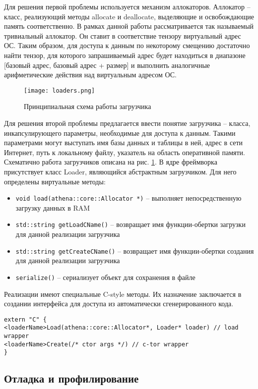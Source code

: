 Для решения первой проблемы используется механизм аллокаторов. Аллокатор --
класс, реализующий методы allocate и deallocate, выделяющие и освобождающие
память соответственно. В рамках данной работы рассматривается так называемый
тривиальный аллокатор. Он ставит в соответствие тензору виртуальный адрес ОС.
Таким образом, для доступа к данным по некоторому смещению достаточно найти
тензор, для которого запрашиваемый адрес будет находиться в диапазоне [базовый адрес, базовый адрес + размер]
и выполнить аналогичные арифметические действия над виртуальным адресом ОС.

\begin{figure}[h]
    \centering
    \texttt{[image: loaders.png]}
    \caption{Принципиальная схема работы загрузчика}
    \label{fig:loaders}
\end{figure}

Для решения второй проблемы предлагается ввести понятие загрузчика -- класса,
инкапсулирующего параметры, необходимые для доступа к данным. Такими параметрами
могут выступать имя базы данных и таблицы в ней, адрес в сети Интернет, путь
к локальному файлу, указатель на область оперативной памяти. Схематично
работа загрузчиков описана на рис. \ref{fig:loaders}.
В ядре фреймворка присутствует класс Loader, являющийся абстрактным загрузчиком.
Для него определены виртуальные методы:
\begin{itemize}
    \item \texttt{void load(athena::core::Allocator *)} -- выполняет непосредственную загрузку данных в RAM
    \item \texttt{std::string getLoadCName()} -- возвращает имя функции-обертки загрузки для данной реализации загрузчика
    \item \texttt{std::string getCreateCName()} -- возвращает имя функции-обертки создания для данной реализации загрузчика
    \item \texttt{serialize()} -- сериализует объект для сохранения в файле
\end{itemize}
Реализации имеют специальные C-style методы. Их назначение заключается в
создании интерфейса для доступа из автоматически сгенерированного кода.
\begin{lstlisting}
extern "C" {
<loaderName>Load(athena::core::Allocator*, Loader* loader) // load wrapper
<loaderName>Create(/* ctor args */) // c-tor wrapper
}
\end{lstlisting}

\subsection{Отладка и профилирование}

